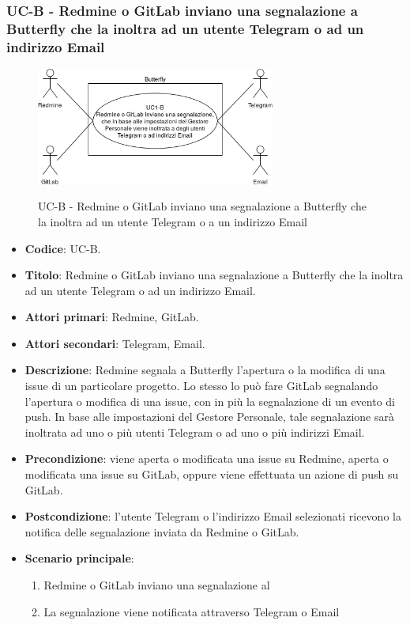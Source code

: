\subsubsection{UC\theuccount-B - Redmine o GitLab inviano una segnalazione a Butterfly che la inoltra ad un utente Telegram o ad un indirizzo Email}
    \begin{figure}[H]
		\centering
		\includegraphics[width=0.7\textwidth]{img/casi_d'uso/UC1.png}\\
		\caption{UC\theuccount-B - Redmine o GitLab inviano una segnalazione a Butterfly che la inoltra ad un utente Telegram o a un indirizzo Email}
	\end{figure}
	\begin{itemize}
		\item \textbf{Codice}: UC\theuccount-B.
		\item \textbf{Titolo}: Redmine o GitLab inviano una segnalazione a Butterfly che la inoltra ad un utente Telegram o ad un indirizzo Email.
		\item \textbf{Attori primari}: Redmine, GitLab.
		\item \textbf{Attori secondari}: Telegram, Email.
		\item \textbf{Descrizione}:  Redmine segnala a Butterfly l'apertura o la modifica di una issue di un particolare progetto. Lo stesso lo può fare GitLab segnalando l'apertura o modifica di una issue, con in più la segnalazione di un evento di push. In base alle impostazioni del Gestore Personale, tale segnalazione sarà inoltrata ad uno o più utenti Telegram o ad uno o più indirizzi Email.
		\item \textbf{Precondizione}: viene aperta o modificata una issue su Redmine, aperta o modificata una issue su GitLab, oppure viene effettuata un
		azione di push su GitLab.
		\item \textbf{Postcondizione}: l'utente Telegram o l'indirizzo Email selezionati ricevono la notifica delle segnalazione inviata da Redmine o GitLab.
		\item \textbf{Scenario principale}: 
		\begin{enumerate}
			\item Redmine o GitLab inviano una segnalazione al \progetto
			\item La segnalazione viene notificata attraverso Telegram o Email
		\end{enumerate}
		
	\end{itemize}